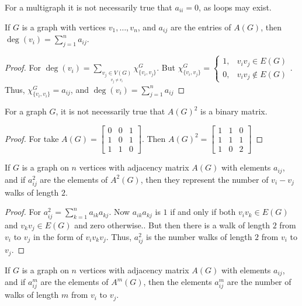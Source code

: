         For a multigraph it is not necessarily true that $a_{ii}=0$, as
        loops may exist.
        \begin{theorem}
        If $G$ is a graph with vertices $v_1,\hdots, v_n$, and $a_{ij}$ are the entries of $A(G)$, then $\deg(v_i) = \sum_{j=1}^{n} a_{ij}$.
        \end{theorem}
        \begin{proof}
        For $\deg(v_i) = \sum_{\underset{v_j\ne v_i}{v_j\in V(G)}}\chi_{\{v_i,v_j\}}^G$. But $\chi_{\{v_i,v_j\}}^G = \begin{cases} 1, & v_iv_j\in E(G)\\ 0, & v_iv_j \notin E(G)\end{cases}$. Thus, $\chi_{\{v_i,v_i\}}^G = a_{ij}$, and $\deg(v_i) = \sum_{j=1}^{n} a_{ij}$
        \end{proof}
        \begin{theorem}
        For a graph $G$, it is not necessarily true that $A(G)^2$ is a binary matrix.
        \end{theorem}
        \begin{proof}
        For take $A(G) = \begin{bmatrix} 0 & 0 & 1 \\ 1 & 0 & 1 \\ 1& 1 & 0 \end{bmatrix}$. Then $A(G)^2 = \begin{bmatrix} 1 & 1 & 0 \\ 1 & 1 & 1 \\ 1 & 0 & 2 \end{bmatrix}$
        \end{proof}
        \begin{theorem}
        If $G$ is a graph on $n$ vertices with adjacency matrix $A(G)$ with elements $a_{ij}$, and if $a^2_{ij}$ are the elements of $A^2(G)$, then they represent the number of $v_{i}-v_{j}$ walks of length $2$.
        \end{theorem}
        \begin{proof}
        For $a^2_{ij} = \sum_{k=1}^{n} a_{ik}a_{kj}$. Now $a_{ik}a_{kj}$ is $1$ if and only if both $v_iv_k \in E(G)$ and $v_kv_j \in E(G)$ and zero otherwise.. But then there is a walk of length $2$ from $v_i$ to $v_j$ in the form of $v_i v_k v_j$. Thus, $a^2_{ij}$ is the number walks of length $2$ from $v_i$ to $v_j$.
        \end{proof} 
        \begin{theorem}
        If $G$ is a graph on $n$ vertices with adjacency matrix $A(G)$ with elements $a_{ij}$, and if $a^m_{ij}$ are the elements of $A^m(G)$, then the elements $a^m_{ij}$ are the number of walks of length $m$ from $v_i$ to $v_j$.
        \end{theorem}
